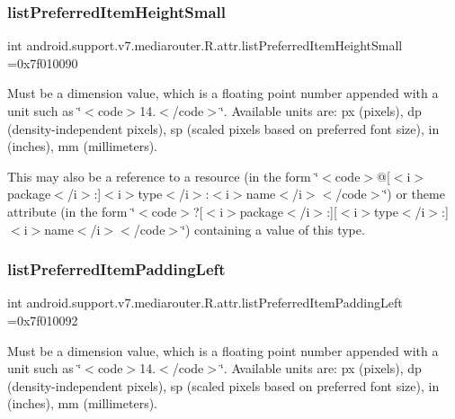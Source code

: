 \subsubsection{\texorpdfstring{list\+Preferred\+Item\+Height\+Small}{listPreferredItemHeightSmall}}
{\footnotesize\ttfamily int android.\+support.\+v7.\+mediarouter.\+R.\+attr.\+list\+Preferred\+Item\+Height\+Small =0x7f010090\hspace{0.3cm}{\ttfamily [static]}}

Must be a dimension value, which is a floating point number appended with a unit such as \char`\"{}$<$code$>$14.\+5sp$<$/code$>$\char`\"{}. Available units are\+: px (pixels), dp (density-\/independent pixels), sp (scaled pixels based on preferred font size), in (inches), mm (millimeters). 

This may also be a reference to a resource (in the form \char`\"{}$<$code$>$@\mbox{[}$<$i$>$package$<$/i$>$\+:\mbox{]}$<$i$>$type$<$/i$>$\+:$<$i$>$name$<$/i$>$$<$/code$>$\char`\"{}) or theme attribute (in the form \char`\"{}$<$code$>$?\mbox{[}$<$i$>$package$<$/i$>$\+:\mbox{]}\mbox{[}$<$i$>$type$<$/i$>$\+:\mbox{]}$<$i$>$name$<$/i$>$$<$/code$>$\char`\"{}) containing a value of this type. \mbox{\label{classandroid_1_1support_1_1v7_1_1mediarouter_1_1R_1_1attr_a27c5b6c05830bc20ec3b8aede4cb84b5}} 
\subsubsection{\texorpdfstring{list\+Preferred\+Item\+Padding\+Left}{listPreferredItemPaddingLeft}}
{\footnotesize\ttfamily int android.\+support.\+v7.\+mediarouter.\+R.\+attr.\+list\+Preferred\+Item\+Padding\+Left =0x7f010092\hspace{0.3cm}{\ttfamily [static]}}

Must be a dimension value, which is a floating point number appended with a unit such as \char`\"{}$<$code$>$14.\+5sp$<$/code$>$\char`\"{}. Available units are\+: px (pixels), dp (density-\/independent pixels), sp (scaled pixels based on preferred font size), in (inches), mm (millimeters). 

